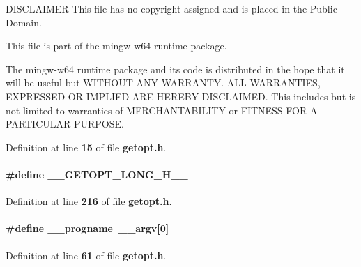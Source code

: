 D\+I\+S\+C\+L\+A\+I\+M\+ER This file has no copyright assigned and is placed in the Public Domain. 

This file is part of the mingw-\/w64 runtime package.

The mingw-\/w64 runtime package and its code is distributed in the hope that it will be useful but W\+I\+T\+H\+O\+UT A\+NY W\+A\+R\+R\+A\+N\+TY. A\+LL W\+A\+R\+R\+A\+N\+T\+I\+ES, E\+X\+P\+R\+E\+S\+S\+ED OR I\+M\+P\+L\+I\+ED A\+RE H\+E\+R\+E\+BY D\+I\+S\+C\+L\+A\+I\+M\+ED. This includes but is not limited to warranties of M\+E\+R\+C\+H\+A\+N\+T\+A\+B\+I\+L\+I\+TY or F\+I\+T\+N\+E\+SS F\+OR A P\+A\+R\+T\+I\+C\+U\+L\+AR P\+U\+R\+P\+O\+SE. 

Definition at line {\bf 15} of file {\bf getopt.\+h}.

\paragraph[{\+\_\+\+\_\+\+G\+E\+T\+O\+P\+T\+\_\+\+L\+O\+N\+G\+\_\+\+H\+\_\+\+\_\+}]{\setlength{\rightskip}{0pt plus 5cm}\#define \+\_\+\+\_\+\+G\+E\+T\+O\+P\+T\+\_\+\+L\+O\+N\+G\+\_\+\+H\+\_\+\+\_\+}\label{soapysdr_2apps_2msvc_2getopt_8h_ad4e526cd7d8899b3032ecde2a6a9fa68}


Definition at line {\bf 216} of file {\bf getopt.\+h}.

\paragraph[{\+\_\+\+\_\+progname}]{\setlength{\rightskip}{0pt plus 5cm}\#define \+\_\+\+\_\+progname~\+\_\+\+\_\+argv[0]}\label{soapysdr_2apps_2msvc_2getopt_8h_a41c2f9db0a7e23392fbbebb1d1c185ec}


Definition at line {\bf 61} of file {\bf getopt.\+h}.

